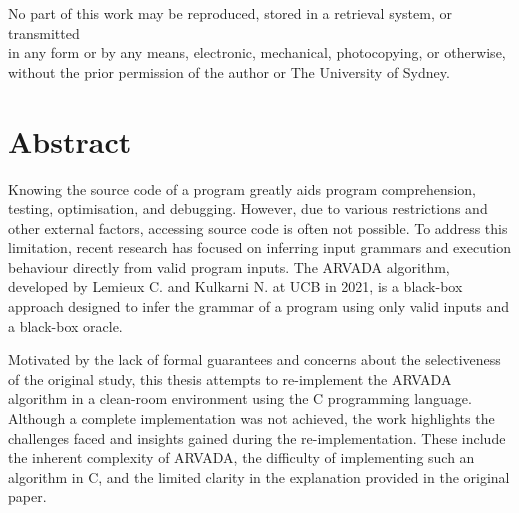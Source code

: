 \onehalfspacing

\restoregeometry
\onehalfspacing

\clearpage\null\thispagestyle{empty}
\begin{center}
    \vspace*{\fill}
    
    
    No part of this work may be reproduced, stored in a retrieval system, or transmitted \\
    in any form or by any means, electronic, mechanical, photocopying, or otherwise, \\
    without the prior permission of the author or The University of Sydney.
\end{center}

\chapter*{Abstract}
Knowing the source code of a program greatly aids program comprehension, testing, optimisation, and debugging. However, due to various restrictions and other external factors, accessing source code is often not possible. To address this limitation, recent research has focused on inferring input grammars and execution behaviour directly from valid program inputs. The ARVADA algorithm, developed by Lemieux C. and Kulkarni N. at UCB in 2021, is a black-box approach designed to infer the grammar of a program using only valid inputs and a black-box oracle.

Motivated by the lack of formal guarantees and concerns about the selectiveness of the original study, this thesis attempts to re-implement the ARVADA algorithm in a clean-room environment using the C programming language. Although a complete implementation was not achieved, the work highlights the challenges faced and insights gained during the re-implementation. These include the inherent complexity of ARVADA, the difficulty of implementing such an algorithm in C, and the limited clarity in the explanation provided in the original paper.


\newpage\thispagestyle{empty}
\tableofcontents



